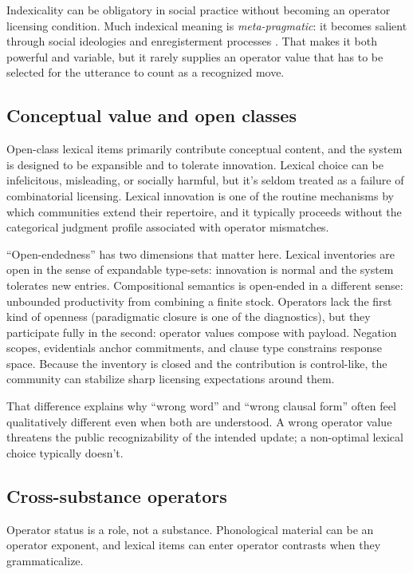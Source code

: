 \documentclass[12pt,letterpaper]{article}
\begin{document}
Indexicality can be obligatory in social practice without becoming an operator licensing condition. Much indexical meaning is \emph{meta-pragmatic}: it becomes salient through social ideologies and enregisterment processes \citep{agha2007,eckert2012}. That makes it both powerful and variable, but it rarely supplies an operator value that has to be selected for the utterance to count as a recognized move.

\subsection{Conceptual value and open classes}

Open-class lexical items primarily contribute conceptual content, and the system is designed to be expansible and to tolerate innovation. Lexical choice can be infelicitous, misleading, or socially harmful, but it's seldom treated as a failure of combinatorial licensing. Lexical innovation is one of the routine mechanisms by which communities extend their repertoire, and it typically proceeds without the categorical judgment profile associated with operator mismatches.

\enquote{Open-endedness} has two dimensions that matter here. Lexical inventories are open in the sense of expandable type-sets: innovation is normal and the system tolerates new entries. Compositional semantics is open-ended in a different sense: unbounded productivity from combining a finite stock. Operators lack the first kind of openness (paradigmatic closure is one of the diagnostics), but they participate fully in the second: operator values compose with payload. Negation scopes, evidentials anchor commitments, and clause type constrains response space. Because the inventory is closed and the contribution is control-like, the community can stabilize sharp licensing expectations around them.

That difference explains why \enquote{wrong word} and \enquote{wrong clausal form} often feel qualitatively different even when both are understood. A wrong operator value threatens the public recognizability of the intended update; a non-optimal lexical choice typically doesn't.

\subsection{Cross-substance operators}

Operator status is a role, not a substance. Phonological material can be an operator exponent, and lexical items can enter operator contrasts when they grammaticalize.
\end{document}
